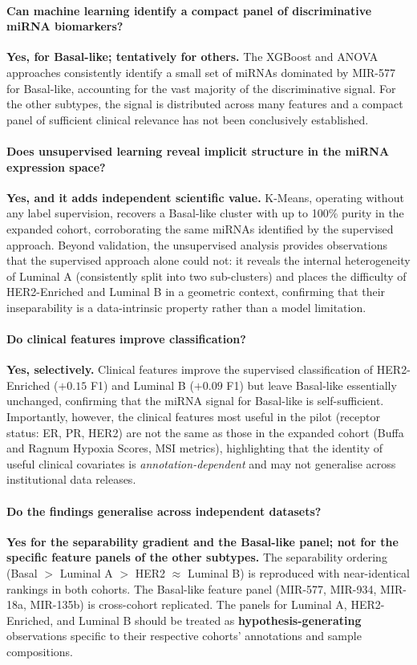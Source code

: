 \paragraph{Can machine learning identify a compact panel of discriminative miRNA biomarkers?}
\textbf{Yes, for Basal-like; tentatively for others.}
The XGBoost and ANOVA approaches consistently identify a small set of miRNAs dominated
by MIR-577 for Basal-like, accounting for the vast majority of the discriminative
signal. For the other subtypes, the signal is distributed across many features and a
compact panel of sufficient clinical relevance has not been conclusively established.
 
\paragraph{Does unsupervised learning reveal implicit structure in the miRNA expression space?}
\textbf{Yes, and it adds independent scientific value.}
K-Means, operating without any label supervision, recovers a Basal-like cluster with
up to 100\% purity in the expanded cohort, corroborating the same miRNAs identified
by the supervised approach. Beyond validation, the unsupervised analysis provides
observations that the supervised approach alone could not: it reveals the internal
heterogeneity of Luminal A (consistently split into two sub-clusters) and places the
difficulty of HER2-Enriched and Luminal B in a geometric context, confirming that
their inseparability is a data-intrinsic property rather than a model limitation.
 
\paragraph{Do clinical features improve classification?}
\textbf{Yes, selectively.}
Clinical features improve the supervised classification of HER2-Enriched
($+0.15$ F1) and Luminal B ($+0.09$ F1) but leave Basal-like essentially unchanged,
confirming that the miRNA signal for Basal-like is self-sufficient. Importantly,
however, the clinical features most useful in the pilot (receptor status: ER, PR,
HER2) are not the same as those in the expanded cohort (Buffa and Ragnum Hypoxia
Scores, MSI metrics), highlighting that the identity of useful clinical covariates is
\textit{annotation-dependent} and may not generalise across institutional data
releases.
 
\paragraph{Do the findings generalise across independent datasets?}
\textbf{Yes for the separability gradient and the Basal-like panel; not for the
specific feature panels of the other subtypes.}
The separability ordering (Basal $>$ Luminal A $>$ HER2 $\approx$ Luminal B) is
reproduced with near-identical rankings in both cohorts. The Basal-like feature
panel (MIR-577, MIR-934, MIR-18a, MIR-135b) is cross-cohort replicated. The panels
for Luminal A, HER2-Enriched, and Luminal B should be treated as
\textbf{hypothesis-generating} observations specific to their respective cohorts'
annotations and sample compositions.
 
